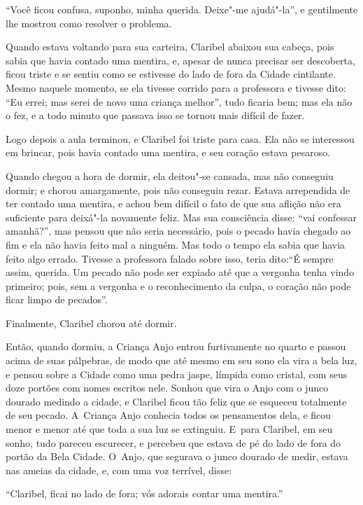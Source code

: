 ``Você ficou confusa, suponho, minha querida. Deixe"-me ajudá"-la'', e
gentilmente lhe mostrou como resolver o problema.

Quando estava voltando para sua carteira, Claribel abaixou sua cabeça,
pois sabia que havia contado uma mentira, e, apesar de nunca
precisar ser descoberta, ficou triste e se sentiu como se estivesse do
lado de fora da Cidade cintilante. Mesmo naquele momento, se ela tivesse
corrido para a professora e tivesse dito: ``Eu errei; mas serei de novo
uma criança melhor'', tudo ficaria bem; mas ela não o fez, e a todo
minuto que passava isso se tornou mais difícil de fazer.

Logo depois a aula terminou, e Claribel foi triste para casa. Ela não se
interessou em brincar, pois havia contado uma mentira, e seu coração
estava pesaroso.

Quando chegou a hora de dormir, ela deitou"-se cansada, mas não conseguiu
dormir; e chorou amargamente, pois não conseguiu rezar. Estava
arrependida de ter contado uma mentira, e achou bem difícil o fato de que
sua aflição não era suficiente para deixá"-la novamente feliz. Mas sua
consciência disse: ``vai confessar amanhã?'', mas pensou que não
seria necessário, pois o pecado havia chegado ao fim e ela não havia
feito mal a ninguém. Mas todo o tempo ela sabia que havia feito algo errado.
Tivesse a professora falado sobre isso, teria dito:``É sempre assim,
querida. Um pecado não pode ser expiado até que a vergonha tenha vindo
primeiro; pois, sem a vergonha e o reconhecimento da culpa, o coração não
pode ficar limpo de pecados''.

Finalmente, Claribel chorou até dormir.

Então, quando dormiu, a Criança Anjo entrou furtivamente no quarto e
passou acima de suas pálpebras, de modo que até mesmo em seu sono ela
vira a bela luz, e pensou sobre a Cidade como uma pedra jaspe, límpida
como cristal, com seus doze portões com nomes escritos nele. Sonhou que
vira o Anjo com o junco dourado medindo a cidade, e Claribel ficou tão
feliz que se esqueceu totalmente de seu pecado. A~Criança Anjo conhecia
todos os pensamentos dela, e ficou menor e menor até que toda a sua luz
se extinguiu. E~para Claribel, em seu sonho, tudo pareceu
escurecer, e percebeu que estava de pé do lado de fora do portão da
Bela Cidade. O~Anjo, que segurava o junco dourado de medir, estava nas
ameias da cidade, e, com uma voz terrível, disse:

``Claribel, ficai no lado de fora; vós adorais contar uma mentira.''

